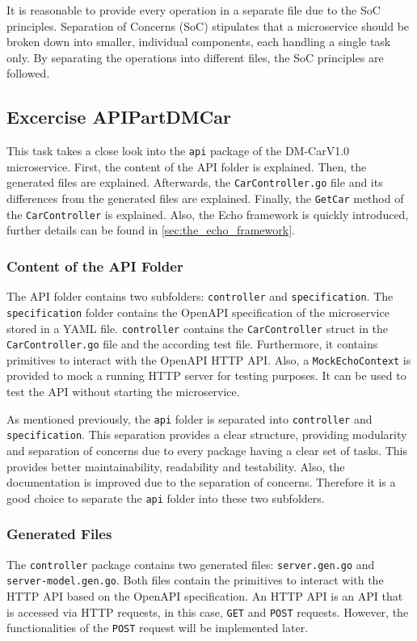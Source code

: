 It is reasonable to provide every operation in a separate file due to the SoC principles.
Separation of Concerns (SoC) stipulates that a microservice should be broken down into smaller, individual components, each handling a single task only.
By separating the operations into different files, the SoC principles are followed.
\subsection{Excercise APIPartDMCar}
This task takes a close look into the \texttt{api} package of the DM-CarV1.0 microservice.
First, the content of the API folder is explained.
Then, the generated files are explained.
Afterwards, the \texttt{CarController.go} file and its differences from the generated files are explained.
Finally, the \texttt{GetCar} method of the \texttt{CarController} is explained.
Also, the Echo framework is quickly introduced, further details can be found in \autoref*{sec:the_echo_framework}.
\subsubsection*{Content of the API Folder}
The API folder contains two subfolders: \texttt{controller} and \texttt{specification}. \linebreak
The \texttt{specification} folder contains the OpenAPI specification of the microservice stored in a YAML file.
\texttt{controller} contains the \texttt{CarController} struct in the \texttt{CarController.go} file and the according test file.
Furthermore, it contains primitives to interact with the OpenAPI HTTP API.
Also, a \texttt{MockEchoContext} is provided to mock a running HTTP server for testing purposes.
It can be used to test the API without starting the microservice.

As mentioned previously, the \texttt{api} folder is separated into \texttt{controller} and \texttt{specification}.
This separation provides a clear structure, providing modularity and separation of concerns due to every package having a clear set of tasks.
This provides better maintainability, readability and testability.
Also, the documentation is improved due to the separation of concerns.
Therefore it is a good choice to separate the \texttt{api} folder into these two subfolders.
\subsubsection*{Generated Files}
The \texttt{controller} package contains two generated files: \texttt{server.gen.go} and \hfill \linebreak \texttt{server-model.gen.go}.
Both files contain the primitives to interact with the HTTP API based on the OpenAPI specification.
An HTTP API is an API that is accessed via HTTP requests, in this case, \texttt{GET} and \texttt{POST} requests.
However, the functionalities of the \texttt{POST} request will be implemented later. 

